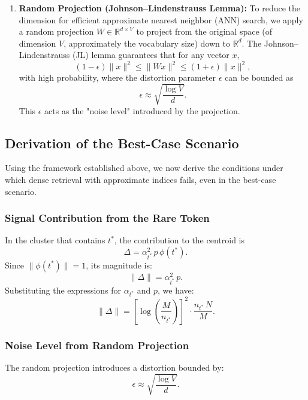 \documentclass[sigconf,review]{acmart}
\begin{document}
\begin{enumerate}
\item \textbf{Random Projection (Johnson–Lindenstrauss Lemma):} To reduce the dimension for efficient approximate nearest neighbor (ANN) search, we apply a random projection $W\in \mathbb{R}^{d\times V}$ to project from the original space (of dimension $V$, approximately the vocabulary size) down to $\mathbb{R}^d$. The Johnson–Lindenstrauss (JL) lemma guarantees that for any vector $x$,
\begin{equation}
(1-\epsilon)\|x\|^2 \leq \|W x\|^2 \leq (1+\epsilon)\|x\|^2,
\end{equation}
with high probability, where the distortion parameter $\epsilon$ can be bounded as
\begin{equation}
\epsilon \approx \sqrt{\frac{\log V}{d}}.
\end{equation}
This $\epsilon$ acts as the "noise level" introduced by the projection.
\end{enumerate}

\subsection{Derivation of the Best-Case Scenario}
Using the framework established above, we now derive the conditions under which dense retrieval with approximate indices fails, even in the best-case scenario.

\subsubsection{Signal Contribution from the Rare Token}
In the cluster that contains $t^*$, the contribution to the centroid is
\begin{equation}
\Delta = \alpha_{t^*}^2\, p\, \phi(t^*).
\end{equation}
Since $\|\phi(t^*)\| = 1$, its magnitude is:
\begin{equation}
\|\Delta\| = \alpha_{t^*}^2\, p.
\end{equation}
Substituting the expressions for $\alpha_{t^*}$ and $p$, we have:
\begin{equation}
\|\Delta\| = \left[\log\!\left(\frac{M}{n_{t^*}}\right)\right]^2 \cdot \frac{n_{t^*}\, N}{M}.
\end{equation}

\subsubsection{Noise Level from Random Projection}
The random projection introduces a distortion bounded by:
\begin{equation}
\epsilon \approx \sqrt{\frac{\log V}{d}}.
\end{equation}
\end{document}
